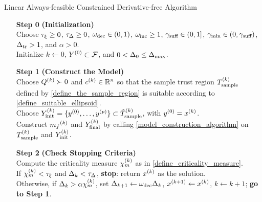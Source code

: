 \documentclass{article}
\newcommand{\real}{\mathbb R}
\begin{document}
{
\begin{fullwidth}[leftmargin=0in, rightmargin=0in, width=\linewidth-0.5in]
\begin{flushleft}

\begin{algorithm}[H]
    \caption{Linear Always-feasible Constrained Derivative-free Algorithm}
    \label{linearly_constrained_dfo_simple}
    \begin{itemize}
        \item[\textbf{Step 0}] \textbf{(Initialization)} \\
            Choose
            $\tau_{\xi}\ge 0$,
            $\tau_{\Delta} \ge 0$, 
            $\omega_{\text{dec}} \in (0,1)$, 
            $\omega_{\text{inc}} \ge 1$,  
            $ \gamma_{\textrm{suff}} \in (0,1]$, 
            $\gamma_{\textrm{min}} \in (0,\gamma_{\textrm{suff}})$,
            $\Delta_{\textrm{tr}} > 1$,
			and $\alpha > 0$. \\
            Initialize
            $k\gets 0$,
            $Y^{(0)} \subset {\mathcal F}$,
            and $0 < \Delta_0 \le {\Delta_{\textrm{max}}}$.
            
        \item[\textbf{Step 1}] \textbf{(Construct the Model)} \\
        Choose ${Q^{(k)}}\succ 0$ and $\ck\in \real^n$ so that the sample trust region ${T_{\text{sample}}^{(k)}}$ defined by \cref{define_the_sample_region} is suitable according to \cref{define_suitable_ellipsoid}.\\
       Choose $Y_{\textrm{init}}^{(k)} =\{y^{(0)}, \ldots, y^{(p)}\} \subset {\hat{T}_{\text{sample}}^{(k)}}$,  with $y^{(0)} = x^{(k)}$.  \\
           Construct ${{m}_f}^{(k)}$ and $Y_{\textrm{final}}^{(k)}$ by calling \cref{model_construction_algorithm} on ${T_{\text{sample}}^{(k)}}$ and $Y_{\textrm{init}}^{(k)}$.  
        
        \item[\textbf{Step 2}] \textbf{(Check Stopping Criteria)} \\
            Compute the criticality measure ${\chi_m^{(k)}}$ as in \cref{define_criticality_measure}. \\
            If $ {\chi_m^{(k)}} < \tau_{\xi} $ and $\Delta_k <\tau_{\Delta}$,  {\bf stop}: return $x^{(k)}$ as the solution.   \\
            Otherwise, if $\Delta_k > \alpha {\chi_m^{(k)}}$,   
            set 
                $\Delta_{k+1} \gets \omega_{\text{dec}}\Delta_k$, 
                ${{x}^{(k+1)}} \gets x^{(k)}$,
                $k \gets k+1$; {\bf go to Step 1}.
           

\end{itemize}
\end{algorithm}
\end{flushleft}
\end{fullwidth}}
\end{document}

